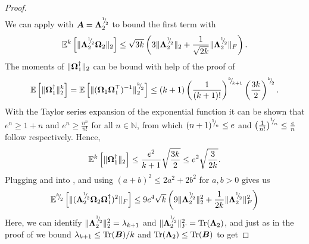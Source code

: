 \documentclass[12pt]{article}
\begin{document}
\begin{proof}
\begin{align}
        \label{equ:nystrom-proof-processed-tail}
    \end{align}
    We can apply  with $\boldsymbol{A} = \boldsymbol{\Lambda}_2^{{}^{1}{\mskip -5mu/\mskip -3mu}_{2}}$ to bound the first term with
    \begin{equation}
        \mathbb{E}^k\left[ \lVert \boldsymbol{\Lambda}_2^{{}^{1}{\mskip -5mu/\mskip -3mu}_{2}} \boldsymbol{\Omega}_2 \rVert _2 \right]
        \leq \sqrt{3 k} \left( 3 \lVert \boldsymbol{\Lambda}_2^{{}^{1}{\mskip -5mu/\mskip -3mu}_{2}} \rVert _2 + \frac{1}{\sqrt{2k}} \lVert \boldsymbol{\Lambda}_2^{{}^{1}{\mskip -5mu/\mskip -3mu}_{2}} \rVert _F \right).
        \label{equ:spectral-norm-bound-applied}
    \end{equation}
    The moments of $\lVert \boldsymbol{\Omega}_1^{\dagger} \rVert _2$ can be bound with help of the proof of \cite[lemma B.3]{tropp-2023-randomized-algorithms}
    \begin{equation}
        \mathbb{E}\left[ \lVert \boldsymbol{\Omega}_1^{\dagger} \rVert _2^{k} \right]
        = \mathbb{E}\left[ \lVert ( \boldsymbol{\Omega}_1 \boldsymbol{\Omega}_1^{\top} )^{-1} \rVert _2^{{}^{k}{\mskip -5mu/\mskip -3mu}_{2}} \right]
        \leq \left( k + 1 \right) \left( \frac{1}{(k + 1)!}\right)^{{}^{k}{\mskip -5mu/\mskip -3mu}_{k + 1}} \left( \frac{3 k}{2}\right)^{{}^{k}{\mskip -5mu/\mskip -3mu}_{2}}.
    \end{equation}
    With the Taylor series expansion of the exponential function it can be shown that $e^n \geq 1 + n$ and $e^n \geq \frac{n^n}{n!}$ for all $n \in \mathbb{N}$, from which $(n + 1)^{{}^{1}{\mskip -5mu/\mskip -3mu}_{n}} \leq e$ and $\left( \frac{1}{n!} \right)^{{}^{1}{\mskip -5mu/\mskip -3mu}_{n}} \leq \frac{e}{n}$ follow respectively. Hence,
    \begin{equation}
        \mathbb{E}^{k}\left[ \lVert \boldsymbol{\Omega}_1^{\dagger} \rVert _2 \right]
        \leq \frac{e^2}{k + 1}\sqrt{ \frac{3k}{2} }
        \leq e^2 \sqrt{\frac{3}{2k}}.
        \label{equ:pinv-spectral-norm-bound}
    \end{equation}
    Plugging  and   into , and using $(a + b)^2 \leq 2a^2 + 2b^2$ for $a, b > 0$ gives us
    \begin{equation}
        \mathbb{E}^{{}^{k}{\mskip -5mu/\mskip -3mu}_{2}}\left[ \lVert (\boldsymbol{\Lambda}_2^{{}^{1}{\mskip -5mu/\mskip -3mu}_{2}} \boldsymbol{\Omega}_2 \boldsymbol{\Omega}_1^{\dagger} )^2 \rVert _F \right]
        \leq  9 e^4 \sqrt{k} \left( 9 \lVert \boldsymbol{\Lambda}_2^{{}^{1}{\mskip -5mu/\mskip -3mu}_{2}} \rVert _2^2 + \frac{1}{2k} \lVert \boldsymbol{\Lambda}_2^{{}^{1}{\mskip -5mu/\mskip -3mu}_{2}} \rVert _F^2 \right)
    \end{equation}
    Here, we can identify $\lVert \boldsymbol{\Lambda}_2^{{}^{1}{\mskip -5mu/\mskip -3mu}_{2}} \rVert _2^2 = \lambda_{k+1}$ and $\lVert \boldsymbol{\Lambda}_2^{{}^{1}{\mskip -5mu/\mskip -3mu}_{2}} \rVert _F^2 = \operatorname{Tr}(\boldsymbol{\Lambda}_2)$, and just as in the proof of \cite[lemma 3.1]{meyer-2021-hutch-optimal} we bound $\lambda_{k+1} \leq \operatorname{Tr}(\boldsymbol{B})/k$ and $\operatorname{Tr}(\boldsymbol{\Lambda}_2) \leq \operatorname{Tr}(\boldsymbol{B})$ to get 

\end{proof}
\end{document}
